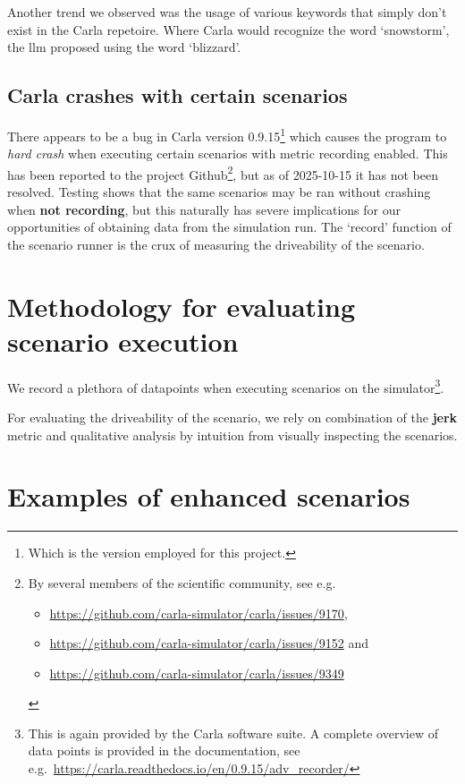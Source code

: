 Another trend we observed was the usage of various keywords that simply don't
exist in the Carla repetoire. Where Carla would recognize the word `snowstorm',
the \acrfull{llm} proposed using the word `blizzard'.



\subsection{Carla crashes with certain scenarios}

There appears to be a bug in Carla version 0.9.15\footnote{Which is the version
    employed for this project.} which causes the program to \emph{hard crash} when
executing certain scenarios with metric recording enabled. This has been
reported to the project Github\footnote{By several members of the scientific community, see e.g.
    \begin{itemize}\item  \url{https://github.com/carla-simulator/carla/issues/9170}, \item
              \url{https://github.com/carla-simulator/carla/issues/9152} and \item
              \url{https://github.com/carla-simulator/carla/issues/9349}\end{itemize}}, but as of 2025-10-15
it has not been resolved. Testing shows that the same scenarios may be ran without crashing when
\textbf{not recording}, but this naturally has severe implications for our
opportunities of obtaining data from the simulation run. The `record' function
of the scenario runner is the crux of measuring the driveability of the
scenario.


\section{Methodology for evaluating scenario execution}

We record a plethora of datapoints when executing scenarios on the simulator\footnote{This is again
    provided by the Carla software suite. A complete overview of data points is provided in the
    documentation, see e.g.~\url{https://carla.readthedocs.io/en/0.9.15/adv_recorder/}}.

For evaluating the driveability of the scenario, we rely on combination of the \textbf{jerk} metric
and qualitative analysis by intuition from visually inspecting the scenarios.

\section{Examples of enhanced scenarios}

